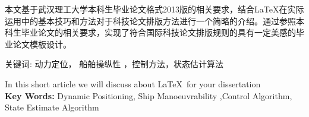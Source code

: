 本文基于武汉理工大学本科生毕业论文格式2013版的相关要求，结合\LaTeX 在实际运用中的基本技巧和方法对于科技论文排版方法进行一个简略的介绍。通过参照本科生毕业论文的相关要求，实现了符合国际科技论文排版规则的具有一定美感的毕业论文模板设计。

{\heiti 关键词:}  \songti 动力定位， 船舶操纵性 ，控制方法，状态估计算法

In this short article we will discuss about \LaTeX\,  for your dissertation \\

\textbf{Key Words:} Dynamic Positioning, Ship Manoeuvrability ,Control Algorithm, State Estimate Algorithm




